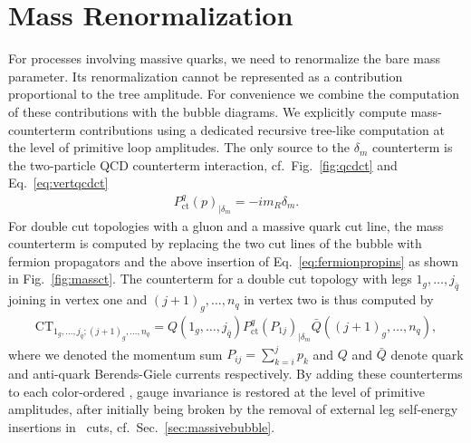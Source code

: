 \section{Mass Renormalization}
\label{sec:mrenorm}
For processes involving massive quarks, we need to renormalize the
bare mass parameter. Its renormalization cannot be represented
as a contribution proportional to the tree amplitude. For convenience we combine the computation of these
contributions with the bubble diagrams. We explicitly
compute mass-counterterm contributions using a dedicated recursive
tree-like computation at the level of primitive loop amplitudes. The only source to the $\delta_m$ counterterm is the two-particle QCD counterterm interaction, cf.~Fig.~\ref{fig:qcdct} and Eq.~\eqref{eq:vertqcdct} 
\begin{align}\label{eq:fermionpropins}
  P^q_{\text{ct}}(p)_{|\delta_m} = -im_R \delta_m.
\end{align}
For double cut topologies with a gluon and a massive quark
cut line, the mass counterterm is computed by replacing the two cut lines of the bubble with fermion propagators and the above insertion of
Eq.~\eqref{eq:fermionpropins} as shown in Fig.~\ref{fig:massct}. The counterterm for a double cut topology
with legs $1_g,\dots,j_{\bar{q}}$ joining in vertex one and
$(j+1)_g,\dots,n_q$ in vertex two is thus computed by
\begin{align}
  \text{CT}_{1_g,\dots,j_{\bar{q}};(j+1)_g,\dots,n_q} =
  Q(1_g,\dots,j_{\bar{q}}) P^q_{\text{ct}}(P_{1j})_{|\delta_m} \bar{Q}((j+1)_g,\dots,n_q),
\end{align}
where we denoted the momentum sum $P_{ij}=\sum_{k=i}^jp_k$ and $Q$ and
$\bar{Q}$ denote quark and anti-quark Berends-Giele currents respectively. By adding these
counterterms to each color-ordered \ola, gauge invariance is
restored at the level of primitive amplitudes, after initially being broken by the removal of external leg self-energy insertions in \olb~cuts, cf.~Sec.~\ref{sec:massivebubble}.
